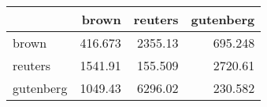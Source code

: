 \begin{tabular}{lrrr}
\hline
           &    brown &   reuters &   gutenberg \\
\hline
 brown     &  416.673 &  2355.13  &     695.248 \\
 reuters   & 1541.91  &   155.509 &    2720.61  \\
 gutenberg & 1049.43  &  6296.02  &     230.582 \\
\hline
\end{tabular}